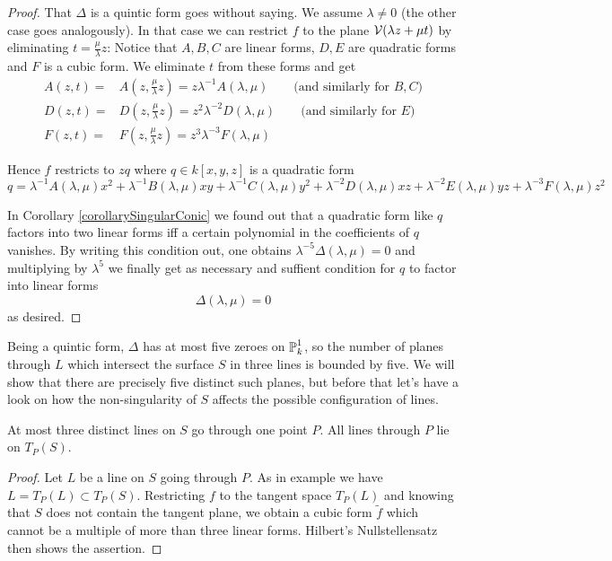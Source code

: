 \begin{proof}
That $\Delta$ is a quintic form goes without saying.
We assume $\lambda \neq 0$ (the other case goes analogously).
In that case we can restrict $f$ to the plane $\operatorname{\mathcal V}(\lambda z + \mu t)$ by eliminating $t = \frac\mu\lambda z$:
Notice that $A,B,C$ are linear forms, $D,E$ are quadratic forms and $F$ is a cubic form.
We eliminate $t$ from these forms and get
\begin{align}
A(z,t) =& A(z,\frac\mu\lambda z) = z\lambda^{-1} A(\lambda,\mu) \qquad \text{(and similarly for $B,C$)} \\
D(z,t) =& D(z,\frac\mu\lambda z) = z^2\lambda^{-2} D(\lambda,\mu) \qquad \text{(and similarly for $E$)} \\
F(z,t) =& F(z,\frac\mu\lambda z) = z^3\lambda^{-3} F(\lambda,\mu)
\end{align}

Hence $f$ restricts to $zq$ where $q \in k[x,y,z]$ is a quadratic form
\begin{equation}
q =
\lambda^{-1} A(\lambda,\mu) x^2
+\lambda^{-1} B(\lambda,\mu) xy
+\lambda^{-1} C(\lambda,\mu) y^2
+\lambda^{-2} D(\lambda,\mu) xz
+\lambda^{-2} E(\lambda,\mu) yz
+\lambda^{-3} F(\lambda,\mu) z^2
\end{equation}

In Corollary \ref{corollarySingularConic} we found out that a quadratic form like $q$ factors into two linear forms iff a certain polynomial in the coefficients of $q$ vanishes.
By writing this condition out, one obtains $\lambda^{-5} \Delta(\lambda,\mu) = 0$ and multiplying by $\lambda^5$ we finally get as necessary and suffient condition for $q$ to factor into linear forms
\begin{equation}
\Delta(\lambda,\mu) = 0
\end{equation}
as desired.
\end{proof}

Being a quintic form, $\Delta$ has at most five zeroes on $\operatorname{\mathbb P}^1_k$, so the number of planes through $L$ which intersect the surface $S$ in three lines is bounded by five.
We will show that there are precisely five distinct such planes, but before that let's have a look on how the non-singularity of $S$ affects the possible configuration of lines.

\begin{lemma}
At most three distinct lines on $S$ go through one point $P$.
All lines through $P$ lie on $T_P(S)$.
\end{lemma}
\begin{proof}
Let $L$ be a line on $S$ going through $P$.
As in example \label{exampleTangentPlaneOfLinearSubsets} we have $L = T_P(L) \subset T_P(S)$.
Restricting $f$ to the tangent space $T_P(L)$ and knowing that $S$ does not contain the tangent plane, we obtain a cubic form $\widetilde f$ which cannot be a multiple of more than three linear forms.
Hilbert's Nullstellensatz then shows the assertion.
\end{proof}

